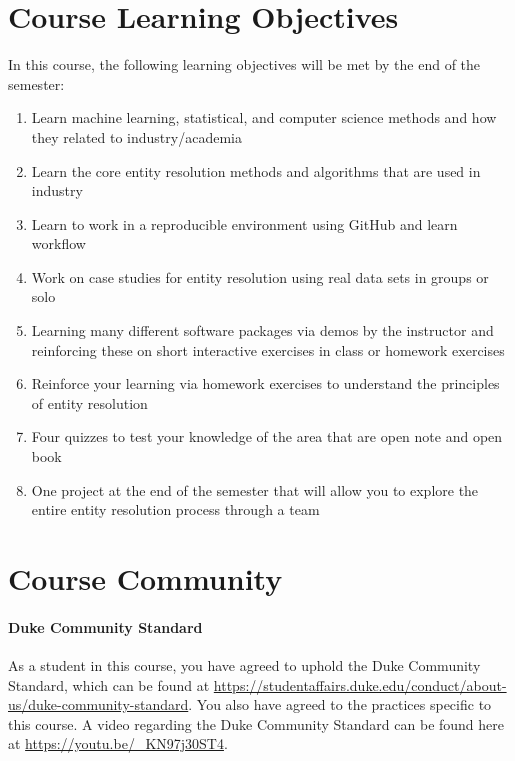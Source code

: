 \documentclass[11pt]{article}
\begin{document}
\section{Course Learning Objectives}
In this course, the following learning objectives will be met by the end of the semester:
\begin{enumerate}
\item Learn machine learning, statistical, and computer science methods and how they related to industry/academia
\item Learn the core entity resolution methods and algorithms that are used in industry
\item Learn to work in a reproducible environment using GitHub and learn workflow
\item Work on case studies for entity resolution using real data sets in groups or solo
\item Learning many different software packages via demos by the instructor and reinforcing these on short interactive exercises in class or homework exercises
\item Reinforce your learning via homework exercises to understand the principles of entity resolution
\item Four quizzes to test your knowledge of the area that are open note and open book
\item One project at the end of the semester that will allow you to explore the entire entity resolution process through a team%
\end{enumerate}

\section{Course Community}



\paragraph{Duke Community Standard}
As a student in this course, you have agreed to uphold the Duke Community Standard, which can be found at \url{https://studentaffairs.duke.edu/conduct/about-us/duke-community-standard}. You also have agreed to the practices specific to this course.  A video regarding the Duke Community Standard can be found here at \url{https://youtu.be/_KN97j30ST4}.
\end{document}
